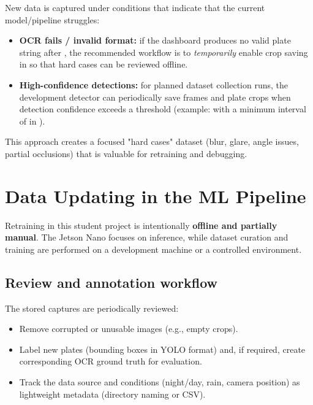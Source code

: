 \noindent
New data is captured under conditions that indicate that the current model/pipeline struggles:
\begin{itemize}
	\item \textbf{OCR fails / invalid format:} if the dashboard produces no valid plate string after
	,
	the recommended workflow is to \emph{temporarily} enable crop saving in
	so that hard cases can be reviewed offline.
	
	\item \textbf{High-confidence detections:} for planned dataset collection runs, the development detector can
	periodically save frames and plate crops when detection confidence exceeds a threshold (example:
	 with a minimum interval of  in
	).
\end{itemize}
\noindent
This approach creates a focused "hard cases" dataset (blur, glare, angle issues, partial occlusions) that is valuable for retraining and debugging.

\section{Data Updating in the ML Pipeline}

\noindent
Retraining in this student project is intentionally \textbf{offline and partially manual}.
The Jetson Nano focuses on inference, while dataset curation and training are performed on a development machine or a controlled environment.

\subsection{Review and annotation workflow}

\noindent
The stored captures are periodically reviewed:
\begin{itemize}
	\item Remove corrupted or unusable images (e.g., empty crops).
	\item Label new plates (bounding boxes in YOLO format) and, if required, create corresponding OCR ground truth for evaluation.
	\item Track the data source and conditions (night/day, rain, camera position) as lightweight metadata (directory naming or CSV).
\end{itemize}

